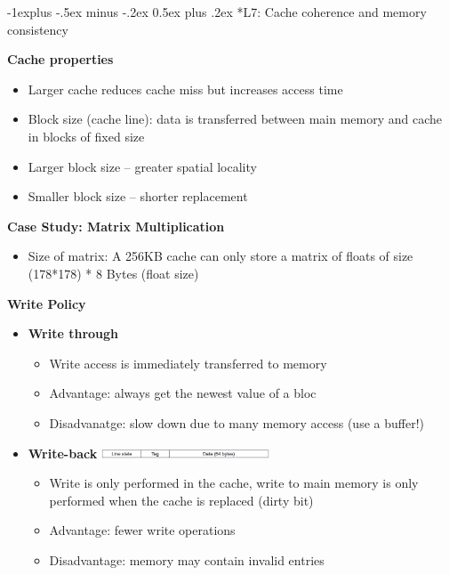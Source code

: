 \documentclass[10pt, landscape]{article}
\makeatletter
\renewcommand{\subsection}{\@startsection{subsection}{2}{0mm}%
                                {-1explus -.5ex minus -.2ex}%
                                {0.5ex plus .2ex}%
                                {\normalfont\normalsize\bfseries}}
\makeatother
\begin{document}
\begin{multicols}{4}
\subsection*{L7: Cache coherence and memory consistency}

\textbf{Cache properties}
\begin{itemize}
    \item Larger cache reduces cache miss but increases access time 
    \item Block size (cache line): data is transferred between main memory and cache in blocks of fixed size 
    \item Larger block size -- greater spatial locality 
    \item Smaller block size -- shorter replacement 
\end{itemize}

\textbf{Case Study: Matrix Multiplication}
\begin{itemize}
    \item Size of matrix: A 256KB cache can only store a matrix of floats of size (178*178) * 8 Bytes (float size)
\end{itemize}

\textbf{Write Policy}
\begin{itemize}
    \item \textbf{Write through}
    \begin{itemize}
        \item Write access is immediately transferred to memory
        \item Advantage: always get the newest value of a bloc
        \item Disadvanatge: slow down due to many memory access (use a buffer!)
    \end{itemize}
    \item \textbf{Write-back}
    \includegraphics*[width=5cm]{write_back_cache.png}
    \begin{itemize}
        \item Write is only performed in the cache, write to main memory is only performed when the cache is replaced (dirty bit)
        \item Advantage: fewer write operations 
        \item Disadvantage: memory may contain invalid entries  
    \end{itemize}
\end{itemize}


\end{multicols}
\end{document}
